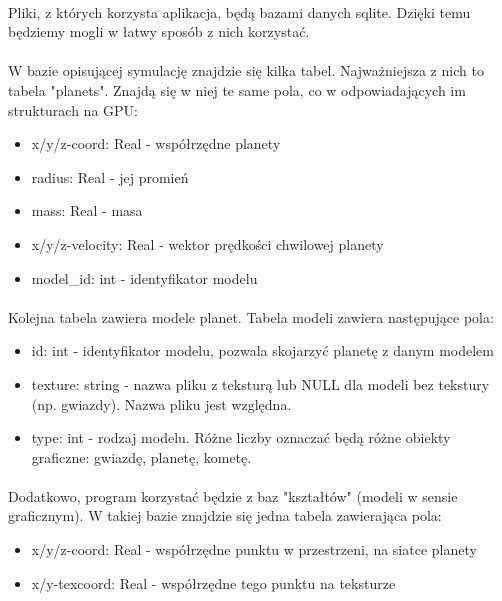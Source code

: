 \paragraph{}

Pliki, z których korzysta aplikacja, będą bazami danych sqlite. Dzięki temu będziemy mogli w łatwy sposób z nich korzystać.

\paragraph{}

W bazie opisującej symulację znajdzie się kilka tabel. Najważniejsza z nich to tabela "planets". Znajdą się w niej te same pola, co w odpowiadających im strukturach na GPU:
\begin{itemize}
\item{x/y/z-coord: Real - współrzędne planety}
\item{radius: Real - jej promień}
\item{mass: Real - masa}
\item{x/y/z-velocity: Real - wektor prędkości chwilowej planety}
\item{model\_id: int - identyfikator modelu}
\end{itemize}

\paragraph{}

Kolejna tabela zawiera modele planet. Tabela modeli zawiera następujące pola:
\begin{itemize}
\item{id: int - identyfikator modelu, pozwala skojarzyć planetę z danym modelem}
\item{texture: string - nazwa pliku z teksturą lub NULL dla modeli bez tekstury (np. gwiazdy). Nazwa pliku jest względna.}
\item{type: int - rodzaj modelu. Różne liczby oznaczać będą różne obiekty graficzne: gwiazdę, planetę, kometę.}
\end{itemize}

\paragraph{}
Dodatkowo, program korzystać będzie z baz "kształtów" (modeli w sensie graficznym). W takiej bazie znajdzie się jedna tabela zawierająca pola:
\begin{itemize}
\item{x/y/z-coord: Real - współrzędne punktu w przestrzeni, na siatce planety}
\item{x/y-texcoord: Real - współrzędne tego punktu na teksturze}
\end{itemize}
